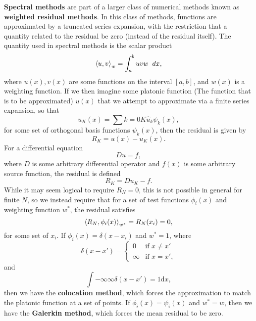 {\bf Spectral methods} are  part of a larger class of numerical methods known as {\bf weighted residual methods}. In this class of methods, functions are approximated by a truncated series expansion, with the restriction that a quantity related to the residual be zero (instead of the residual itself). The quantity used in spectral methods is the scalar product 
\begin{equation}\label{eq:scalarProduct}
\scprod{u}{v}{w} = \int{a}{b}{uvw}{dx},
\end{equation}
where  $u(x),v(x)$ are some functions on the interval $[a,b]$, and $w(x)$ is a weighting function. If we then imagine some platonic function (The function that is to be approximated) $u(x)$ that we attempt to approximate via a finite series expansion, so that
\begin{equation}\label{eq:seriesExpansion}
u_K(x) = \sum{k=0}{K}{\hat{u}_k \psi_k(x)},
\end{equation}
for some set of orthogonal basis functions $\psi_k(x)$, then the residual is given by
\begin{equation}
R_K = u(x)-u_K(x).
\end{equation} 
For a differential equation
\begin{equation}
Du = f,
\end{equation}
where $D$ is some arbitrary differential operator and $f(x)$ is some arbitrary source function, the residual is defined
\begin{equation}
R_K = Du_K - f.
\end{equation}
While it may seem logical to require $R_N = 0$, this is not possible in general for finite $N$, so we instead require that for a set of test functions $\phi_i(x)$ and weighting function $w^*$, the residual satisfies
\begin{equation}\label{eq:SpectralZero}
\left < R_N,\phi_i(x) \right >_{w^*} = R_N(x_i) = 0,
\end{equation}
for some set of $x_i$. If $\phi_i(x) = \delta(x-x_i)$ and $w^* = 1$, where
\begin{equation}
\delta(x-x') = 
\begin{cases}
0 &\text{if } x \neq x'\\
\infty &\text{if } x = x',
\end{cases}
\end{equation}
and
\begin{equation}
 \int{-\infty}{\infty}{\delta(x-x') = 1}{\textrm{d}x},
\end{equation}
 then we have the {\bf colocation method}, which forces the approximation to match the platonic function at a set of points. If $\phi_i(x) = \psi_i(x)$ and $w^* = w$, then we have the {\bf Galerkin method}, which forces the mean residual to be zero. 

